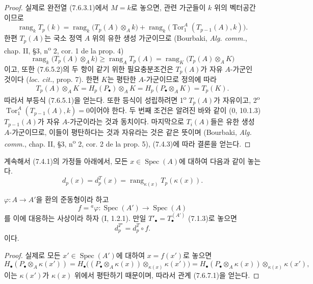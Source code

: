 \begin{proof}
실제로 완전열 (7.6.3.1)에서 $M=k$로 놓으면, 관련 가군들이 $k$ 위의
벡터공간이므로
\[
  \operatorname{rang}_k T_p(k)
  =
  \operatorname{rang}_k\bigl(T_p(A)\otimes_A k\bigr)
  +
  \operatorname{rang}_k\bigl(\operatorname{Tor}_1^A(T_{p-1}(A),k)\bigr).
\]
한편 $T_p(A)$는 국소 정역 $A$ 위의 유한 생성 가군이므로
(Bourbaki, \emph{Alg. comm.}, chap. II, \S 3,
n\textsuperscript{o} 2, cor. 1 de la prop. 4)
\[
  \operatorname{rang}_k\bigl(T_p(A)\otimes_A k\bigr)
  \geq
  \operatorname{rang}_A T_p(A)
  =
  \operatorname{rang}_K\bigl(T_p(A)\otimes_A K\bigr)
  \tag{7.6.5.2}\label{III.7.6.5.2.fr}
\]
이고, 또한 (7.6.5.2)의 두 항이 같기 위한 필요충분조건은 $T_p(A)$가
자유 $A$-가군인 것이다 (\emph{loc. cit.}, prop. 7). 한편 $K$는 평탄한
$A$-가군이므로 정의에 따라
\[
  T_p(A)\otimes_A K
  =
  H_p(P_\bullet)\otimes_A K
  =
  H_p(P_\bullet\otimes_A K)
  =
  T_p(K).
\]
따라서 부등식 (7.6.5.1)을 얻는다. 또한 등식이 성립하려면
1\textsuperscript{o} $T_p(A)$가 자유이고,
2\textsuperscript{o} $\operatorname{Tor}_1^A(T_{p-1}(A),k)=0$이어야
한다. 두 번째 조건은 알려진 바와 같이 ($0$, 10.1.3)
$T_{p-1}(A)$가 자유 $A$-가군이라는 것과 동치이다. 마지막으로
$T_i(A)$들은 유한 생성 $A$-가군이므로, 이들이 평탄하다는 것과
자유라는 것은 같은 뜻이며 (Bourbaki, \emph{Alg. comm.}, chap. II,
\S 3, n\textsuperscript{o} 2, cor. 2 de la prop. 5), (7.4.3)에 따라
결론을 얻는다.
\end{proof}

\begin{env}[7.6.6]
\label{III.7.6.6-fr}
계속해서 (7.4.1)의 가정들 아래에서, 모든
$x\in\operatorname{Spec}(A)$에 대하여 다음과 같이 놓는다.
\[
  d_p(x)=d_p^T(x)=\operatorname{rang}_{\kappa(x)}T_p(\kappa(x)).
  \tag{7.6.6.1}\label{III.7.6.6.1.fr}
\]
\end{env}

\begin{lemma}[7.6.7]
\label{III.7.6.7-fr}
$\varphi:A\to A'$을 환의 준동형이라 하고
\[
  f={}^a\!\varphi:
  \operatorname{Spec}(A')\longrightarrow\operatorname{Spec}(A)
\]
를 이에 대응하는 사상이라 하자 (I, 1.2.1). 만일
$T'_\bullet=T_\bullet^{(A')}$ (7.1.3)로 놓으면
\[
  d_p^{T'}=d_p^T\circ f.
  \tag{7.6.7.1}\label{III.7.6.7.1.fr}
\]
이다.
\end{lemma}

\begin{proof}
실제로 모든 $x'\in\operatorname{Spec}(A')$에 대하여 $x=f(x')$로 놓으면
\[
  H_\bullet(P_\bullet\otimes_A\kappa(x'))
  =
  H_\bullet\bigl((P_\bullet\otimes_A\kappa(x))
    \otimes_{\kappa(x)}\kappa(x')\bigr)
  =
  H_\bullet(P_\bullet\otimes_A\kappa(x))
    \otimes_{\kappa(x)}\kappa(x'),
\]
이는 $\kappa(x')$가 $\kappa(x)$ 위에서 평탄하기 때문이며,
따라서 관계 (7.6.7.1)을 얻는다.
\end{proof}


